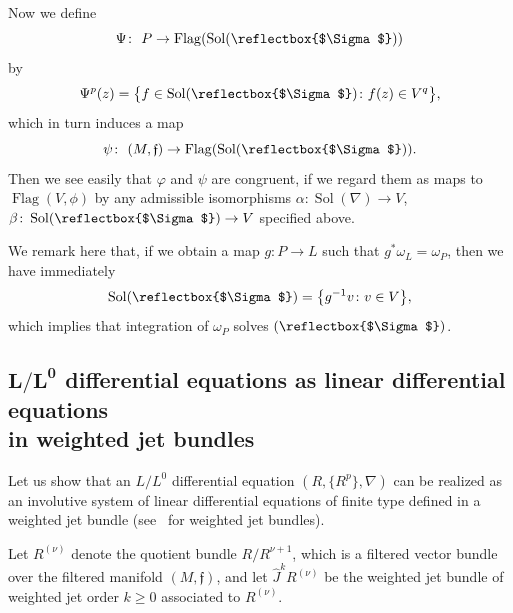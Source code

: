 \documentclass[pdftex]{sigma}%
\newcommand{\f}{\mathfrak f}
\newcommand{\wJ}{\widehat J}
\newcommand{\Flag}{\operatorname{Flag}}
\newcommand{\Sol}{\operatorname{Sol}}
\DeclareRobustCommand{\amgiS}{\text{\reflectbox{$\Sigma$}}}
\numberwithin{equation}{section}
\begin{document}
Now we define
\[
	\Psi\colon\ P \to \Flag(\Sol( \amgiS))
\]
by
\[
	\Psi^p(z) = \big\{ f \in \Sol(\amgiS) \colon f(z) \in V^q \big\},
\]
which in turn induces a map
\[
	\psi\colon\ (M, \f) \to \Flag(\Sol(\amgiS)).
\]
Then we see easily that $\varphi$ and $\psi$ are congruent,
if we regard them as maps to $\Flag(V, \phi)$
by any admissible isomorphisms $\alpha\colon\Sol(\nabla) \to V$, $\beta\colon \Sol(\amgiS) \to V$ specified above.

We remark here that, if we obtain a map
$g\colon P \to L$ such that $g^* \omega_L = \omega_P$,
then we have immediately
\[
	\Sol(\amgiS) = \big\{ g^{-1}v \colon v \in V \big\},
\]
which implies that integration of $\omega_P$ solves $(\amgiS)$.


\subsection[L/L0 differential equations as linear differential equations in weighted jet bundles]
{$\boldsymbol{L/L^0}$ differential equations as linear differential equations \\in weighted jet bundles}

Let us show that an $L/L^0$ differential equation
$(R, \{R^p\}, \nabla)$ can be realized as an involutive system of linear differential equations of
finite type defined in a weighted jet bundle (see~\cite{Mor2002} for weighted jet bundles).


Let $R^{(\nu)}$ denote the quotient bundle $R/R^{\nu+1}$, which is a filtered vector bundle over the filtered manifold $(M,\f)$, and let $\wJ^{k}R^{(\nu)}$ be the weighted jet bundle of weighted jet order $k\ge 0$ associated to $R^{(\nu)}$.
\end{document}
